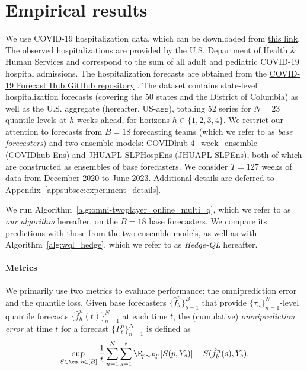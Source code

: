 \section{Empirical results}\label{sec:experiments}
We use COVID-19 hospitalization data, which can be downloaded from \href{https://forecast-eval.s3.us-east-2.amazonaws.com/hospitalizations.zip}{this link}. The observed hospitalizations are provided by the U.S. Department of Health \& Human Services and correspond to the sum of all adult and pediatric COVID-19 hospital admissions. The hospitalization forecasts are obtained from the \href{https://github.com/reichlab/covid19-forecast-hub/}{COVID-19 Forecast Hub GitHub repository} \cite{cramer2022covidhub}. The dataset contains state-level hospitalization forecasts (covering the 50 states and the District of Columbia) as well as the U.S. aggregate (hereafter, US-agg), totaling 52 series for $N=23$ quantile levels at $h$ weeks ahead, for horizons $h \in \{1,2,3,4\}$. We restrict our attention to forecasts from $B=18$ forecasting teams (which we refer to as \emph{base forecasters}) and two ensemble models: COVIDhub-4\_week\_ensemble (COVIDhub-Ens) and JHUAPL-SLPHospEns (JHUAPL-SLPEns), both of which are constructed as ensembles of base forecasters. We consider $T=127$ weeks of data from December 2020 to June 2023. Additional details are deferred to Appendix~\ref{appsubsec:experiment_details}.

We run Algorithm~\ref{alg:omni-twoplayer_online_multi_q}, which we refer to as \textit{our algorithm} hereafter, on the $B=18$ base forecasters. We compare its predictions with those from the two ensemble models, as well as with Algorithm~\ref{alg:wql_hedge}, which we refer to as \textit{Hedge-QL} hereafter.

\paragraph{Metrics}
We primarily use two metrics to evaluate performance: the omniprediction error and the quantile loss. Given base forecasters $\{\hat{f}_b^n\}_{b=1}^B$ that provide $\{\tau_n\}_{n=1}^N$-level quantile forecasts $\{\hat{f}_b^n(t)\}_{n=1}^N$ at each time $t$, the (cumulative) \textit{omniprediction error} at time $t$ for a forecast $\{P_t^n\}_{n=1}^N$ is defined as
\begin{align}\label{eq:omni_error_def}
\sup_{S \in \cs,\, b \in [B]} \frac{1}{t} \sum_{n=1}^N \sum_{s=1}^t \E_{p \sim P_s^n} [S(p, Y_s)] - S(\hat{f}_b^n(s), Y_s).
\end{align}

